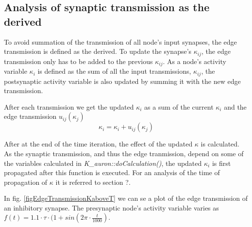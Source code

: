 

	





			\subsection{Analysis of synaptic transmission as the derived}
			To avoid summation of the transmission of all node's input synapses, the edge transmission is defined as the derived.
			To update the synapse's $\kappa_{ij}$, the edge transmission only has to be added to the previous $\kappa_{ij}$. %
			As a node's activity variable $\kappa_i$ is defined as the sum of all the input transmissions, $\kappa_{ij}$,
				the postsynaptic activity variable is also updated by summing it with the new edge transmission.

			After each transmission we get the updated $\kappa_i$ as a sum of the current $\kappa_i$ and the edge transmission $u_{ij}(\kappa_j)$
			\begin{equation}
				\kappa_i = \kappa_i + u_{ij}(\kappa_j)
			\end{equation}
			
			After at the end of the time iteration, the effect of the updated $\kappa$ is calculated.
			As the synaptic transmission, and thus the edge tranmission, depend on some of the variables calculated in \emph{K\_auron::doCalculation()}, the updated $\kappa_i$ is first propagated after this function is executed.
			For an analysis of the time of propagation of $\kappa$ it is referred to section ?. %

			In fig. \ref{figEdgeTransmissionKaboveT} we can se a plot of the edge transmission of an inhibitory synapse.
			The presynaptic node's activity variable varies as \mbox{$f(t) = 1.1 \cdot \tau \cdot (1 + sin( 2\pi \cdot \frac{t}{1000})$}.
	
